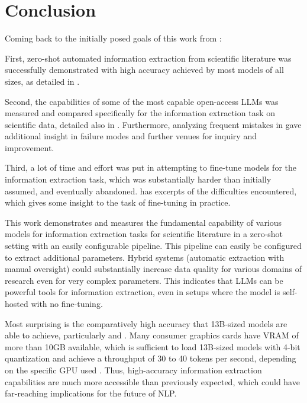 \chapter{Conclusion}\label{chap:conclusion}

Coming back to the initially posed goals of this work from :

First, zero-shot automated information extraction from scientific literature was successfully demonstrated with high accuracy achieved by most models of all sizes, as detailed in .

Second, the capabilities of some of the most capable open-access \glspl{LLM} was measured and compared specifically for the information extraction task on scientific data, detailed also in .
Furthermore, analyzing frequent mistakes in  gave additional insight in failure modes and further venues for inquiry and improvement.

Third, a lot of time and effort was put in attempting to fine-tune models for the information extraction task, which was substantially harder than initially assumed, and eventually abandoned.
 has excerpts of the difficulties encountered, which gives some insight to the task of fine-tuning in practice.


This work demonstrates and measures the fundamental capability of various models for information extraction tasks for scientific literature in a zero-shot setting with an easily configurable pipeline.
This pipeline can easily be configured to extract additional parameters.
Hybrid systems (automatic extraction with manual oversight) could substantially increase data quality for various domains of research even for very complex parameters.
This indicates that \glspl{LLM} can be powerful tools for information extraction, even in setups where the model is self-hosted with no fine-tuning.

Most surprising is the comparatively high accuracy that 13B-sized models are able to achieve, particularly  and .
Many consumer graphics cards have VRAM of more than 10GB available, which is sufficient to load 13B-sized models with 4-bit quantization and achieve a throughput of 30 to 40 tokens per second, depending on the specific GPU used \cite{hardwarerequirements_2023}.
Thus, high-accuracy information extraction capabilities are much more accessible than previously expected, which could have far-reaching implications for the future of \gls{NLP}.







